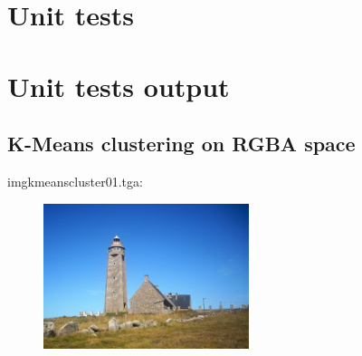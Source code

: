 \begin{scriptsize}
\begin{ttfamily}

\end{ttfamily}
\end{scriptsize}

\section{Unit tests}

\begin{scriptsize}
\begin{ttfamily}

\end{ttfamily}
\end{scriptsize}

\section{Unit tests output}

\begin{scriptsize}
\begin{ttfamily}

\end{ttfamily}
\end{scriptsize}

\subsection{K-Means clustering on RGBA space}

imgkmeanscluster01.tga:\\
\begin{center}
\begin{figure}[H]
\centering\includegraphics[width=6cm]{./imgkmeanscluster01.png}\\
\end{figure}
\end{center}

